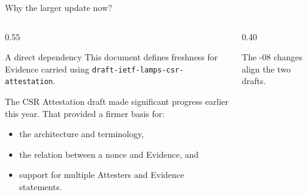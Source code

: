 \documentclass[aspectratio=169,10pt]{beamer}
\begin{document}
\begin{frame}{Why the larger update now?}
  \begin{columns}[T,onlytextwidth]
    \begin{column}{0.55\textwidth}
      \begin{block}{A direct dependency}
        This document defines freshness for Evidence carried using
        \texttt{draft-ietf-lamps-csr-attestation}.
      \end{block}
      \vspace{0.2cm}
      The CSR Attestation draft made \alert{significant progress earlier this year}.  That provided a firmer basis for:
      \begin{itemize}
        \item the architecture and terminology,
        \item the relation between a nonce and Evidence, and
        \item support for multiple Attesters and Evidence statements.
      \end{itemize}
    \end{column}
    \begin{column}{0.40\textwidth}
      \vspace{0.25cm}

      \centering\small The -08 changes align the two drafts.
    \end{column}
  \end{columns}
\end{frame}
\end{document}
